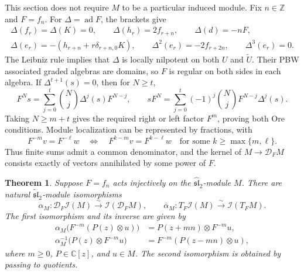 \documentclass[11pt]{article}
\newcommand{\C}{\mathbb C}
\newcommand{\Z}{\mathbb Z}
\newcommand{\g}{\widehat{\mathfrak{sl}}_2}
\newcommand{\gt}{\widetilde{\mathfrak{sl}}_2}
\newcommand{\ad}{\operatorname{ad}}
\newcommand{\I}{\mathcal I}
\newcommand{\D}{\mathcal D}
\newtheorem{theorem}{Theorem}[section]
\theoremstyle{definition}
\begin{document}
This section does not require \(M\) to be a particular induced module.
Fix \(n\in\Z\) and \(F=f_n\). For \(\Delta=\ad F\), the brackets give
\[
\begin{gathered}
 \Delta(f_r)=\Delta(K)=0,\qquad
 \Delta(h_r)=2f_{r+n},\qquad \Delta(d)=-nF,\\
 \Delta(e_r)=-(h_{r+n}+r\delta_{r+n,0}K),\qquad
 \Delta^2(e_r)=-2f_{r+2n},\qquad \Delta^3(e_r)=0.
\end{gathered}
\]
The Leibniz rule implies that \(\Delta\) is locally nilpotent on
both \(U\) and \(\widetilde U\). Their PBW associated graded algebras
are domains, so \(F\) is regular on both sides in each algebra.
If \(\Delta^{t+1}(s)=0\), then for \(N\ge t\),
\[
 F^Ns=\sum_{j=0}^t\binom Nj\Delta^j(s)F^{N-j},\qquad
 sF^N=\sum_{j=0}^t(-1)^j\binom NjF^{N-j}\Delta^j(s).
\]
Taking \(N\ge m+t\) gives the required right or left factor \(F^m\),
proving both Ore conditions. Module localization can be represented
by fractions, with
\[
 F^{-m}v=F^{-\ell}w
 \quad\Longleftrightarrow\quad
 F^{k-m}v=F^{k-\ell}w
 \quad\text{for some }k\ge\max\{m,\ell\}.
\]
Thus finite sums admit a common denominator, and the kernel of
\(M\to\D_FM\) consists exactly of vectors annihilated by some power
of \(F\).

\begin{theorem}\label{thm:commute}
Suppose \(F=f_n\) acts injectively on the \(\g\)-module \(M\).
There are natural \(\gt\)-module isomorphisms
\[
 \alpha_M:\D_F\I(M)\xrightarrow{\sim}\I(\D_FM),\qquad
 \overline\alpha_M:T_F\I(M)\xrightarrow{\sim}\I(T_FM).
\]
The first isomorphism and its inverse are given by
\begin{equation}\label{eq:alpha}
\begin{aligned}
 \alpha_M\bigl(F^{-m}(P(z)\otimes u)\bigr)
   &=P(z+mn)\otimes F^{-m}u,\\
 \alpha_M^{-1}\bigl(P(z)\otimes F^{-m}u\bigr)
   &=F^{-m}(P(z-mn)\otimes u),
\end{aligned}
\end{equation}
where \(m\ge0\), \(P\in\C[z]\), and \(u\in M\). The second
isomorphism is obtained by passing to quotients.
\end{theorem}
\end{document}
